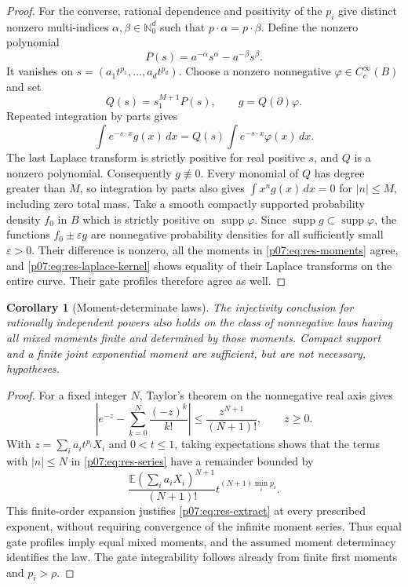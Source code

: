\documentclass[11pt,letterpaper]{article}
\newtheorem{corollary}[theorem]{Corollary}
\theoremstyle{definition}
\theoremstyle{remark}
\newcommand{\1}{\mathbf 1}
\begin{document}
\begin{proof}
For the converse, rational dependence and positivity of the $p_i$
give distinct nonzero multi-indices $\alpha,\beta\in\mathbb N_0^d$
such that $p\cdot\alpha=p\cdot\beta$.  Define the nonzero polynomial
\begin{equation}\label{p07:eq:res-binomial}
 P(s)=a^{-\alpha}s^\alpha-a^{-\beta}s^\beta.
\end{equation}
It vanishes on $s=(a_1t^{p_1},\ldots,a_dt^{p_d})$.
Choose a nonzero nonnegative $\varphi\in C_c^\infty(B)$ and set
\begin{equation}\label{p07:eq:res-null-density}
 Q(s)=s_1^{M+1}P(s),\qquad g=Q(\partial)\varphi.
\end{equation}
Repeated integration by parts gives
\begin{equation}\label{p07:eq:res-laplace-kernel}
 \int e^{-s\cdot x}g(x)\,dx
   =Q(s)\int e^{-s\cdot x}\varphi(x)\,dx.
\end{equation}
The last Laplace transform is strictly positive for real positive $s$,
and $Q$ is a nonzero polynomial.  Consequently $g\not\equiv0$.
Every monomial of $Q$ has degree greater than $M$, so integration by
parts also gives $\int x^n g(x)\,dx=0$ for $|n|\leq M$, including
zero total mass.  Take a smooth compactly supported probability
density $f_0$ in $B$ which is strictly positive on
$\operatorname{supp}\varphi$.  Since
$\operatorname{supp}g\subset\operatorname{supp}\varphi$, the
functions $f_0\pm\varepsilon g$ are nonnegative probability densities
for all sufficiently small $\varepsilon>0$.  Their difference is
nonzero, all the moments in \eqref{p07:eq:res-moments} agree, and
\eqref{p07:eq:res-laplace-kernel} shows equality of their Laplace transforms
on the entire curve.  Their gate profiles therefore agree as well.
\end{proof}

\begin{corollary}[Moment-determinate laws]\label{p07:cor:res-moment-determinate}
The injectivity conclusion for rationally independent powers also
holds on the class of nonnegative laws having all mixed moments finite
and determined by those moments.  Compact support and a finite joint
exponential moment are sufficient, but are not necessary, hypotheses.
\end{corollary}

\begin{proof}
For a fixed integer $N$, Taylor's theorem on the nonnegative real axis
gives
\[
 \left|e^{-z}-\sum_{k=0}^N\frac{(-z)^k}{k!}\right|
 \leq\frac{z^{N+1}}{(N+1)!},\qquad z\geq0.
\]
With $z=\sum_i a_it^{p_i}X_i$ and $0<t\leq1$, taking expectations
shows that the terms with $|n|\leq N$ in
\eqref{p07:eq:res-series} have a remainder bounded by
\[
 \frac{\mathbb E(\sum_i a_iX_i)^{N+1}}{(N+1)!}
 t^{(N+1)\min_i p_i}.
\]
This finite-order expansion justifies
\eqref{p07:eq:res-extract} at every prescribed exponent, without
requiring convergence of the infinite moment series.
Thus equal gate profiles imply equal mixed moments, and the assumed
moment determinacy identifies the law.  The gate integrability follows
already from finite first moments and $p_i>\rho$.
\end{proof}
\end{document}
